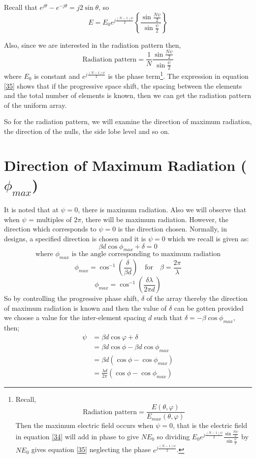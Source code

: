Recall that $e^{j\theta} - e^{-j\theta} = j2\sin\theta$, so
$$
E = E_0e^{j\frac{(N-1)\psi}{2}} \left\{\frac{\sin{\frac{N\psi}{2}}}{\sin{\frac{\psi}{2}}}\right\}
$$

Also, since we are interested in the radiation pattern then, 
\begin{equation}
\label{35}
\text{Radiation pattern} = \frac{1}{N} \frac{\sin{\frac{N\psi}{2}}}{\sin{\frac{\psi}{2}}}
\end{equation}
where $E_0$ is constant and $e^{j\frac{(N-1)\psi}{2}}$ is the phase term\footnote{Recall, 
	$$
	\text{Radiation pattern} = \frac{E(\theta, \varphi)}{E_{max}(\theta, \varphi)}
	$$
	Then the maximum electric field occurs when $\psi = 0$, that is the electric field in equation \ref{34} will add in phase to give $NE_0$ so dividing $E_0e^{j\frac{(N-1)\psi}{2}} \frac{\sin{\frac{N\psi}{2}}}{\sin{\frac{\psi}{2}}}$ by  $NE_0$ gives equation \ref{35} neglecting the phase $e^{j\frac{(N-1)\psi}{2}}$.
}.
The expression in equation \ref{35} shows that if the progressive space shift, the spacing between the elements and the total number of elements is known, then we can get the radiation pattern of the uniform array. 

So for the radiation pattern, we will examine the direction of maximum radiation, the direction of the nulls, the side lobe level and so on.

\section{Direction of Maximum Radiation ($\phi_{max}$)}
It is noted that at $\psi = 0$, there is maximum radiation. Also we will observe that when $\psi$ = multiples of $2\pi$, there will be maximum radiation. However, the direction which corresponds to $\psi = 0$ is the direction chosen. Normally, in designs, a specified direction is chosen and it is $\psi = 0$ which we recall is given as:
$$
\beta d\cos {\phi_{max}} + \delta = 0 
$$
$$
\text{where $\phi_{max}$ is the angle corresponding to maximum radiation}
$$
$$\phi_{max} = \cos^{-1}{(\frac{\delta}{\beta d})} \quad \text{for} \quad \beta = \frac{2\pi}{\lambda} $$
$$\phi_{max} = \cos^{-1}{(\frac{\delta \lambda}{2\pi d})}  $$
So by controlling the progressive phase shift, $\delta$ of the array thereby the direction of maximum radiation is known and then the value of $\delta$ can be gotten provided we choose a value for the inter-element spacing $d$ such that $\delta = -\beta \cos{\phi_{max}}$, then;
\begin{align}
\psi &=\beta d \cos {\varphi} + \delta \\
&=\beta d \cos{\phi} - \beta d \cos{\phi_{max}} \\
\label{36}
&=\beta d (\cos{\phi} - \cos{\phi_{max}}) \\
&=\frac{\lambda d}{2\pi}(\cos{\phi} - \cos{\phi_{max}})
\end{align}


